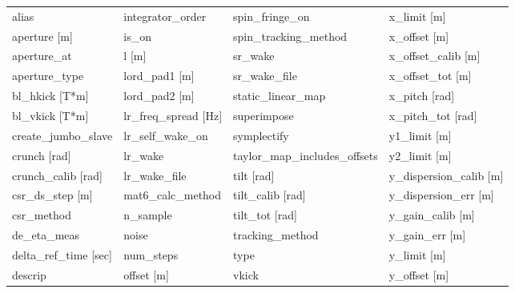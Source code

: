  \begin{tabular}{llll} \toprule
alias                            & integrator_order                 & spin_fringe_on                   & x_limit [m]                      \\
aperture [m]                     & is_on                            & spin_tracking_method             & x_offset [m]                     \\
aperture_at                      & l [m]                            & sr_wake                          & x_offset_calib [m]               \\
aperture_type                    & lord_pad1 [m]                    & sr_wake_file                     & x_offset_tot [m]                 \\
bl_hkick [T*m]                   & lord_pad2 [m]                    & static_linear_map                & x_pitch [rad]                    \\
bl_vkick [T*m]                   & lr_freq_spread [Hz]              & superimpose                      & x_pitch_tot [rad]                \\
create_jumbo_slave               & lr_self_wake_on                  & symplectify                      & y1_limit [m]                     \\
crunch [rad]                     & lr_wake                          & taylor_map_includes_offsets      & y2_limit [m]                     \\
crunch_calib [rad]               & lr_wake_file                     & tilt [rad]                       & y_dispersion_calib [m]           \\
csr_ds_step [m]                  & mat6_calc_method                 & tilt_calib [rad]                 & y_dispersion_err [m]             \\
csr_method                       & n_sample                         & tilt_tot [rad]                   & y_gain_calib [m]                 \\
de_eta_meas                      & noise                            & tracking_method                  & y_gain_err [m]                   \\
delta_ref_time [sec]             & num_steps                        & type                             & y_limit [m]                      \\
descrip                          & offset [m]                       & vkick                            & y_offset [m]                     \\

\end{tabular}
